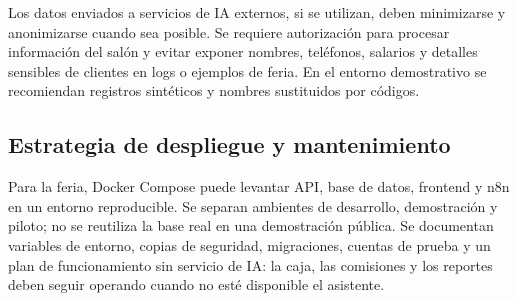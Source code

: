 Los datos enviados a servicios de IA externos, si se utilizan, deben minimizarse y anonimizarse cuando sea posible. Se requiere autorización para procesar información del salón y evitar exponer nombres, teléfonos, salarios y detalles sensibles de clientes en logs o ejemplos de feria. En el entorno demostrativo se recomiendan registros sintéticos y nombres sustituidos por códigos.


\subsection{Estrategia de despliegue y mantenimiento}

Para la feria, Docker Compose puede levantar API, base de datos, frontend y n8n en un entorno reproducible. Se separan ambientes de desarrollo, demostración y piloto; no se reutiliza la base real en una demostración pública. Se documentan variables de entorno, copias de seguridad, migraciones, cuentas de prueba y un plan de funcionamiento sin servicio de IA: la caja, las comisiones y los reportes deben seguir operando cuando no esté disponible el asistente.

